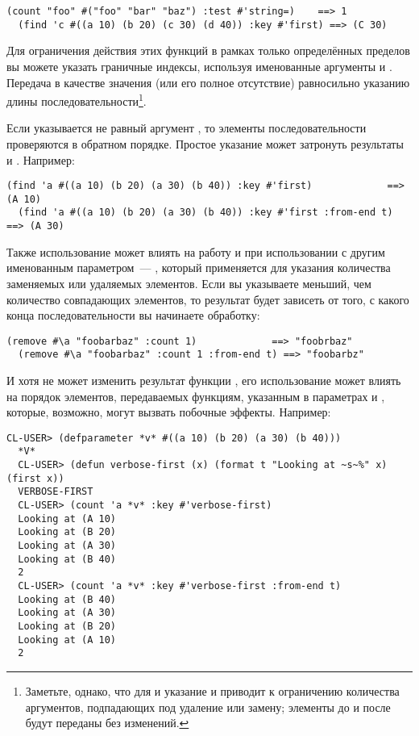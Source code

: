 \begin{lstlisting}[style=lisprepl]
  (count "foo" #("foo" "bar" "baz") :test #'string=)    ==> 1
  (find 'c #((a 10) (b 20) (c 30) (d 40)) :key #'first) ==> (C 30)
\end{lstlisting}

Для ограничения действия этих функций в рамках только определённых пределов вы можете
указать граничные индексы, используя именованные аргументы  и .
Передача  в качестве значения  (или его полное отсутствие)
равносильно указанию длины последовательности\footnote{Заметьте, однако, что для
   и  указание  и  приводит к
  ограничению количества аргументов, подпадающих под удаление или замену; элементы до
   и после  будут переданы без изменений.}.

Если указывается не равный  аргумент , то элементы
последовательности проверяются в обратном порядке.  Простое указание 
может затронуть результаты  и .  Например:

\begin{lstlisting}[style=lisprepl]
  (find 'a #((a 10) (b 20) (a 30) (b 40)) :key #'first)             ==> (A 10)
  (find 'a #((a 10) (b 20) (a 30) (b 40)) :key #'first :from-end t) ==> (A 30)
\end{lstlisting}

Также использование  может влиять на работу  и
 при использовании с другим именованным параметром~--- ,
который применяется для указания количества заменяемых или удаляемых элементов.  Если вы
указываете  меньший, чем количество совпадающих элементов, то результат будет
зависеть от того, с какого конца последовательности вы начинаете обработку:

\begin{lstlisting}[style=lisprepl]
  (remove #\a "foobarbaz" :count 1)             ==> "foobrbaz"
  (remove #\a "foobarbaz" :count 1 :from-end t) ==> "foobarbz"
\end{lstlisting}

И хотя  не может изменить результат функции , его
использование может влиять на порядок элементов, передаваемых функциям, указанным в
параметрах  и , которые, возможно, могут вызвать побочные эффекты.
Например:

\begin{lstlisting}[style=lisprepl]
  CL-USER> (defparameter *v* #((a 10) (b 20) (a 30) (b 40)))
  *V*
  CL-USER> (defun verbose-first (x) (format t "Looking at ~s~%" x) (first x))
  VERBOSE-FIRST
  CL-USER> (count 'a *v* :key #'verbose-first)
  Looking at (A 10)
  Looking at (B 20)
  Looking at (A 30)
  Looking at (B 40)
  2
  CL-USER> (count 'a *v* :key #'verbose-first :from-end t)
  Looking at (B 40)
  Looking at (A 30)
  Looking at (B 20)
  Looking at (A 10)
  2
\end{lstlisting}


